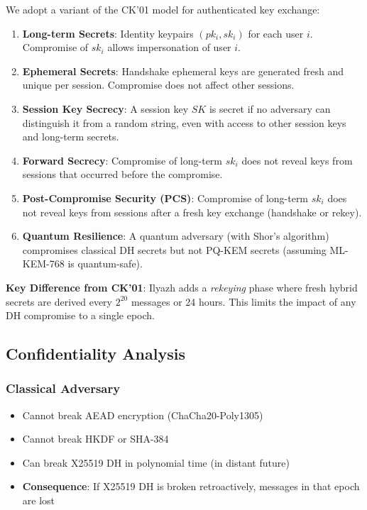 \documentclass[11pt,a4paper,oneside]{article}
\begin{document}
We adopt a variant of the CK'01 model for authenticated key exchange:

\begin{enumerate}
\item \textbf{Long-term Secrets}: Identity keypairs $(pk_i, sk_i)$ for each user $i$. Compromise of $sk_i$ allows impersonation of user $i$.

\item \textbf{Ephemeral Secrets}: Handshake ephemeral keys are generated fresh and unique per session. Compromise does not affect other sessions.

\item \textbf{Session Key Secrecy}: A session key $SK$ is secret if no adversary can distinguish it from a random string, even with access to other session keys and long-term secrets.

\item \textbf{Forward Secrecy}: Compromise of long-term $sk_i$ does not reveal keys from sessions that occurred before the compromise.

\item \textbf{Post-Compromise Security (PCS)}: Compromise of long-term $sk_i$ does not reveal keys from sessions after a fresh key exchange (handshake or rekey).

\item \textbf{Quantum Resilience}: A quantum adversary (with Shor's algorithm) compromises classical DH secrets but not PQ-KEM secrets (assuming ML-KEM-768 is quantum-safe).
\end{enumerate}

\textbf{Key Difference from CK'01}: Ilyazh adds a \textit{rekeying} phase where fresh hybrid secrets are derived every $2^{20}$ messages or 24 hours. This limits the impact of any DH compromise to a single epoch.

\subsection{Confidentiality Analysis}

\subsubsection{Classical Adversary}
\begin{itemize}
\item Cannot break AEAD encryption (ChaCha20-Poly1305)
\item Cannot break HKDF or SHA-384
\item Can break X25519 DH in polynomial time (in distant future)
\item \textbf{Consequence}: If X25519 DH is broken retroactively, messages in that epoch are lost
\end{itemize}
\end{document}
